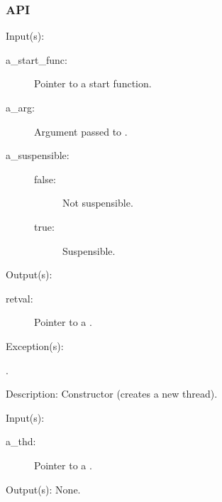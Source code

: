 \subsubsection{API}
\begin{capi}
\label{thd_new}
	\begin{capilist}
	\item[Input(s): ]
		\begin{description}\item[]
		\item[a\_start\_func: ] Pointer to a start function.
		\item[a\_arg: ] Argument passed to .
		\item[a\_suspensible: ]
		\begin{description}\item[]
			\item[false: ] Not suspensible.
			\item[true: ] Suspensible.
		\end{description}
		\end{description}
	\item[Output(s): ]
		\begin{description}\item[]
		\item[retval: ] Pointer to a .
		\end{description}
	\item[Exception(s): ]
		\begin{description}\item[]
		\item[.]
		\end{description}
	\item[Description: ]
		Constructor (creates a new thread).
	\end{capilist}
\label{thd_delete}
	\begin{capilist}
	\item[Input(s): ]
		\begin{description}\item[]
		\item[a\_thd: ] Pointer to a \classname{thd}.
		\end{description}
	\item[Output(s): ] None.

\end{capilist}
\end{capi}
